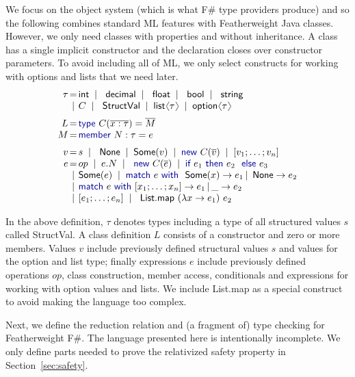 \documentclass[preprint]{sigplanconf}
\newcommand{\langl}{\begin{picture}(4.5,7)
\put(1.1,2.5){\rotatebox{60}{\line(1,0){5.5}}}
\put(1.1,2.5){\rotatebox{300}{\line(1,0){5.5}}}
\end{picture}}
\newcommand{\rangl}{\begin{picture}(4.5,7)
\put(.9,2.5){\rotatebox{120}{\line(1,0){5.5}}}
\put(.9,2.5){\rotatebox{240}{\line(1,0){5.5}}}
\end{picture}}
\newcommand{\kvd}[1]{\textnormal{\textcolor{kvdclr}{\sffamily #1}}}
\newcommand{\ident}[1]{\textnormal{\sffamily #1}}
\newcommand{\lsep}[0]{\;\; | \;\;}
\newcommand{\narrow}[1]{\hspace{-0.85em} #1 \hspace{-0.85em}}
\begin{document}
We focus on the object system (which is what F\# type providers produce) and so the following combines 
standard ML \cite{sml} features with Featherweight Java \cite{fwjava} classes. However, we only need classes with properties and
without inheritance. A class has a single implicit constructor and the declaration closes over 
constructor parameters. To avoid including all of ML, we only select constructs for working with options and lists
that we need later.
%
\begin{equation*}
\begin{array}{rcl}
 \tau &\narrow{=}& \ident{int} \lsep \ident{decimal} \lsep \ident{float} \lsep \ident{bool} \lsep \ident{string} \\[0.0em]
      &\narrow{|}& C \lsep \ident{StructVal} \lsep \ident{list}\langl\tau\rangl \lsep \ident{option}\langl\tau\rangl \\[0.6em]
 L &\narrow{=}& \kvd{type}~C(\overline{x:\tau}) = \overline{M} \\[0.0em]
 M &\narrow{=}& \kvd{member}~N:\tau=e \\[0.6em]
 v &\narrow{=}& s \lsep \ident{None} \lsep \ident{Some}(v) \lsep \kvd{new}~C(\overline{v}) \lsep [v_1; \ldots; v_n] \\[0.0em]
 e &\narrow{=}& op \lsep e.N \lsep \kvd{new}~C(\overline{e}) \lsep {\kvd{if}~e_1~\kvd{then}~e_2~\kvd{else}~e_3}\\
   &\narrow{|}& \ident{Some}(e)\lsep\kvd{match}~e~\kvd{with}~\ident{Some}(x) \rightarrow e_1 \,|\, \ident{None} \rightarrow e_2 \\
   &\narrow{|}& \kvd{match}~e~\kvd{with}~[x_1; \ldots; x_n] \rightarrow e_1 \,|\, \_ \rightarrow e_2 \\
   &\narrow{|}& [e_1;\ldots;e_n]\lsep \ident{List.map}~(\lambda x\rightarrow e_1)~e_2
\end{array}
\end{equation*}

\noindent
In the above definition, $\tau$ denotes types including a type of all structured values $s$ called
\ident{StructVal}. A class definition $L$ consists of a constructor and zero or more members. Values $v$ include 
previously defined structural values $s$ and values for the option and list type; finally expressions $e$ include 
previously defined operations $op$, class construction, member access, conditionals and expressions for working 
with option values and lists. We include \ident{List.map} as a special construct to avoid making the language too complex.

Next, we define the reduction relation and (a fragment of) type checking for Featherweight F\#.
The language presented here is intentionally incomplete. We only define parts needed to prove
the relativized safety property in Section~\ref{sec:safety}.
\end{document}
